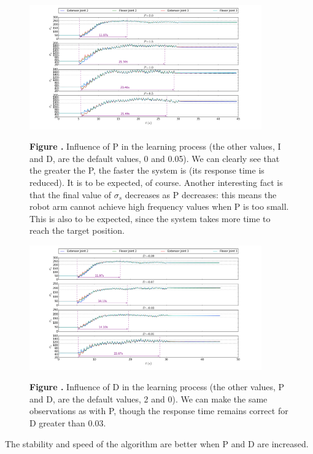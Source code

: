 \begin{figure}[h!]
\begin{center}
\includegraphics[width=10cm]{figures/cpg-coupled/PID-P}
\end{center}
\textbf{\label{fig:20} Figure .}{ Influence of P in the learning process (the other values, I and D, are the default values, 0 and 0.05). We can clearly see that the greater the P, the faster the system is (its response time is reduced). It is to be expected, of course. Another interesting fact is that the final value of $\sigma_{s}$ decreases as P decreases: this means the robot arm cannot achieve high frequency values when P is too small. This is also to be expected, since the system takes more time to reach the target position.}
\end{figure}

\begin{figure}[h!]
\begin{center}
\includegraphics[width=10cm]{figures/cpg-coupled/PID-D}
\end{center}
\textbf{\label{fig:20} Figure .}{ Influence of D in the learning process (the other values, P and D, are the default values, 2 and 0). We can make the same observations as with P, though the response time remains correct for D greater than 0.03. }
\end{figure}

The stability and speed of the algorithm are better when P and D are increased.

